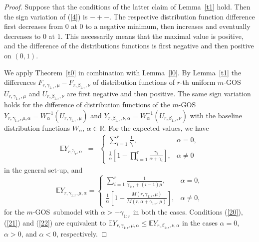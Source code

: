 \documentclass [11pt]{article}
\newcommand{\gos}{GOS}
\begin{document}
\begin{proof}
Suppose that the conditions of the latter claim of Lemma~\ref{t1} hold. Then the sign variation of (\ref{4}) is $-+-$.
The respective distribution function difference first decreases from
$0$ at $0$ to a negative minimum, then increases and eventually decreases to $0$ at $1$. 
This necessarily means that the maximal value is positive, and the difference of the distributions functions is first negative and then positive on $(0,1)$.

\smallskip

We apply Theorem~\ref{t0} in combination with Lemma~\ref{l0}. By Lemma~\ref{t1} the differences $F_{r,\gamma_{1:r},\mu}- F_{r, \beta_{1:r},\nu}$ of distribution functions of $r$-th uniform $m$-\gos\ $U_{r,\gamma_{1:r}, \mu}$ and $U_{r,\beta_{1:r},\nu}$  are first negative and then positive.
The same sign variation holds for the difference %
of distribution functions of the $m$-\gos\ $Y_{r,\gamma_{1:r}, \mu,\alpha} = W_\alpha^{-1}(U_{r,\gamma_{1:r}, \mu})$
and $Y_{r,\beta_{1:r},\nu,\alpha}  =W_\alpha^{-1}(U_{r,\beta_{1:r},\nu})$ with the baseline distribution functions $W_\alpha$, $\alpha \in \mathbb{R}$.
For the expected values, we have
\begin{eqnarray}
\label{23a}
\mathbb{E}Y_{r,\tilde{\gamma}_r,\alpha} & = &
\left\{ 
\begin{array}{ll}
\sum_{i=1}^r \frac{1}{\gamma_{i}}, & \alpha=0, \\[1.75ex]
\frac{1}{\alpha} \left[ 1- 
\prod_{i=1}^r \frac{\gamma_i}{\alpha+\gamma_i} 
\right], 
&  \alpha\neq 0
\end{array}
\right.
\end{eqnarray}
in the general set-up, and
\begin{equation}
\label{23b}
\mathbb{E}Y_{r,\gamma_{1:r}, \mu,\alpha} = \left\{
\begin{array}{ll}
\sum_{i=1}^r \frac{1}{\gamma_{1:r}+(i-1)\mu}, & \alpha=0, \\[1.75ex]
\frac{1}{\alpha}\left[ 1- 
\frac{M(r,\gamma_{1:r},\mu)}{M(r,\alpha+\gamma_{1:r},\mu)}
\right],
& \alpha\neq 0,
\end{array}
\right.
\end{equation}
for the $m$-\gos\ submodel with  $\alpha > -\gamma_{1:r}$ in both the cases.
Conditions (\ref{20}), (\ref{21}) and (\ref{22}) are equivalent
to $\mathbb{E}Y_{r,\gamma_{1:r}, \mu,\alpha} \leq \mathbb{E}Y_{r,\beta_{1:r}, \nu,\alpha}$ in the cases $\alpha= 0$, $\alpha>0$, and $\alpha<0$,  respectively.

\end{proof}
\end{document}
